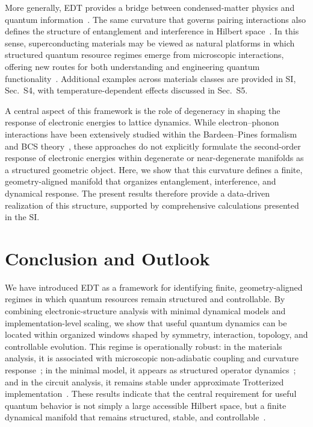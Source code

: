 \documentclass[twocolumn,10pt]{article}
\begin{document}
More generally, EDT provides a bridge between condensed-matter physics and quantum information~\cite{NielsenChuang,Amico2008}. The same curvature that governs pairing interactions also defines the structure of entanglement and interference in Hilbert space~\cite{Berry1984,Xiao2010}. In this sense, superconducting materials may be viewed as natural platforms in which structured quantum resource regimes emerge from microscopic interactions, offering new routes for both understanding and engineering quantum functionality~\cite{BCS1957,Giustino2017}. Additional examples across materials classes are provided in SI, Sec.~S4, with temperature-dependent effects discussed in Sec.~S5.

A central aspect of this framework is the role of degeneracy in shaping the response of electronic energies to lattice dynamics. While electron--phonon interactions have been extensively studied within the Bardeen--Pines formalism and BCS theory~\cite{BardeenPines1955,BCS1957}, these approaches do not explicitly formulate the second-order response of electronic energies within degenerate or near-degenerate manifolds as a structured geometric object. Here, we show that this curvature defines a finite, geometry-aligned manifold that organizes entanglement, interference, and dynamical response. The present results therefore provide a data-driven realization of this structure, supported by comprehensive calculations presented in the SI.



\section*{Conclusion and Outlook}

We have introduced EDT as a framework for identifying finite, geometry-aligned regimes in which quantum resources remain structured and controllable. By combining electronic-structure analysis with minimal dynamical models and implementation-level scaling, we show that useful quantum dynamics can be located within organized windows shaped by symmetry, interaction, topology, and controllable evolution. This regime is operationally robust: in the materials analysis, it is associated with microscopic non-adiabatic coupling and curvature response~\cite{Mead1979,Yarkony1996}; in the minimal model, it appears as structured operator dynamics~\cite{Swingle2018}; and in the circuit analysis, it remains stable under approximate Trotterized implementation~\cite{Lloyd1996,Childs2019}. These results indicate that the central requirement for useful quantum behavior is not simply a large accessible Hilbert space, but a finite dynamical manifold that remains structured, stable, and controllable~\cite{Amico2008,Eisert2010}.
\end{document}
